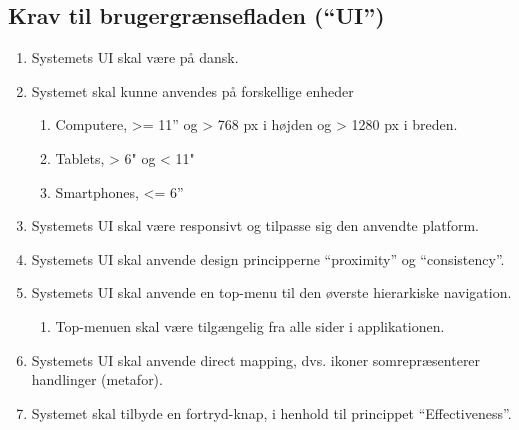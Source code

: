 \subsection{Krav til brugergrænsefladen (“UI”)}
\begin{enumerate}
	\item Systemets UI skal være på dansk.
	\item Systemet skal kunne anvendes på forskellige enheder
	\begin{enumerate}
		\item Computere, >= 11” og > 768 px i højden og > 1280 px i breden.
		\item Tablets, > 6" og < 11"
		\item Smartphones, <= 6”
	\end{enumerate}
	\item Systemets UI skal være responsivt og tilpasse sig den anvendte platform.
	\item Systemets UI skal anvende design principperne “proximity” og “consistency”.
	\item Systemets UI skal anvende en top-menu til den øverste hierarkiske navigation.
	\begin{enumerate}
		\item Top-menuen skal være tilgængelig fra alle sider i applikationen.
	\end{enumerate}
	\item Systemets UI skal anvende direct mapping, dvs. ikoner somrepræsenterer handlinger (metafor).
	\item Systemet skal tilbyde en fortryd-knap, i henhold til princippet “Effectiveness”.
\end{enumerate}


